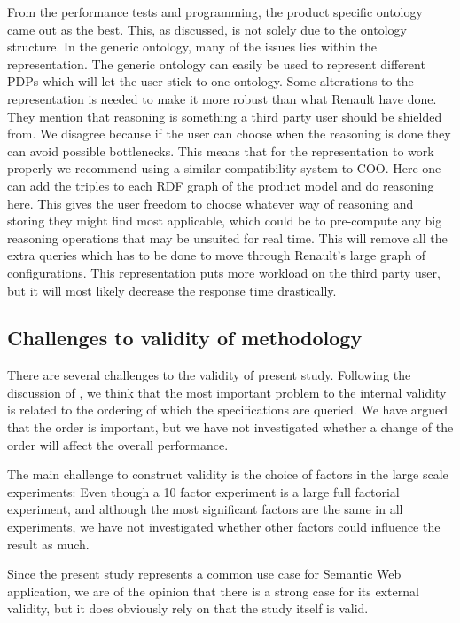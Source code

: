\documentclass{llncs}
\begin{document}
From the performance tests and programming, the product specific
ontology came out as the best.  This, as discussed, is not solely due
to the ontology structure. In the generic ontology, many of the issues
lies within the representation.  The generic ontology can easily be
used to represent different PDPs which will let the user stick to one
ontology.  Some alterations to the representation is needed to make it
more robust than what Renault have done.  They mention that reasoning
is something a third party user should be shielded from. We disagree
because if the user can choose when the reasoning is done they can
avoid possible bottlenecks. This means that for the representation to
work properly we recommend using a similar compatibility system to
COO. Here one can add the triples to each RDF graph of the product
model and do reasoning here. This gives the user freedom to choose
whatever way of reasoning and storing they might find most applicable,
which could be to pre-compute any big reasoning operations that may be
unsuited for real time. This will remove all the extra queries which
has to be done to move through Renault's large graph of
configurations. This representation puts more workload on the third
party user, but it will most likely decrease the response time
drastically.

\subsection{Challenges to validity of methodology}

There are several challenges to the validity of present
study. Following the discussion of \cite{publication-9417}, we
think that the most important problem to the internal validity is
related to the ordering of which the specifications are queried. We
have argued that the order is important, but we have not investigated
whether a change of the order will affect the overall performance.

The main challenge to construct validity is the choice of factors in
the large scale experiments: Even though a 10 factor experiment is a
large full factorial experiment, and although the most significant
factors are the same in all experiments, we have not investigated
whether other factors could influence the result as much.

Since the present study represents a common use case for Semantic Web
application, we are of the opinion that there is a strong case for its
external validity, but it does obviously rely on that the study itself
is valid.
\end{document}
